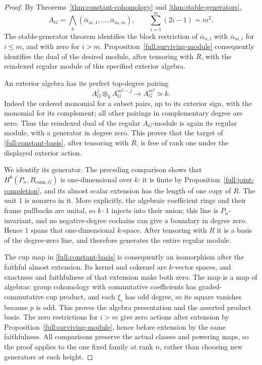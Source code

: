 \begin{proof}
By Theorems~\ref{thm:constant-cohomology} and
\ref{thm:stable-generators},
\[
 A_G=\bigwedge_k
       (\overline\alpha_{m,1},\ldots,\overline\alpha_{m,m}),
 \qquad \sum_{i=1}^m(2i-1)=m^2.
\]
The stable-generator theorem identifies the block restriction of
$\overline\alpha_{n,i}$ with $\overline\alpha_{m,i}$ for
$i\leq m$, and with zero for $i>m$.
Proposition~\ref{full:surviving-module} consequently identifies
the dual of the desired module, after tensoring with $R$,
with the reindexed regular module of this specified exterior
algebra.

An exterior algebra has its perfect top-degree pairing
\[
 A_G^j\otimes_k A_G^{m^2-j}
       \longrightarrow A_G^{m^2}\simeq k.
\]
Indeed the ordered monomial for a subset pairs, up to its
exterior sign, with the monomial for its complement; all other
pairings in complementary degree are zero.
Thus the reindexed dual of the regular $A_G$-module is again
its regular module, with a generator in degree zero.
This proves that the target of \eqref{full:constant-basis},
after tensoring with $R$, is free of rank one under the
displayed exterior action.

We identify its generator.  The preceding comparison shows
that $H^0(P_n,B_{\mathrm{conn},G})$ is one-dimensional over $k$:
it is finite by Proposition~\ref{full:joint-completion},
and its almost scalar extension has the length of one copy
of $R$.  The unit $1$ is nonzero in it.  More explicitly,
the algebraic coefficient rings and their frame pullbacks
are unital, so $k\cdot1$ injects into their union; this line
is $P_n$-invariant, and no negative-degree cochains can give
a boundary in degree zero.  Hence $1$ spans that
one-dimensional $k$-space.  After tensoring with $R$ it is
a basis of the degree-zero line, and therefore generates
the entire regular module.

The cup map in \eqref{full:constant-basis} is consequently an
isomorphism after the faithful almost extension.  Its kernel
and cokernel are $k$-vector spaces, and exactness and
faithfulness of that extension make both zero.
The map is a map of algebras: group cohomology with
commutative coefficients has graded-commutative cup product,
and each $\xi_i$ has odd degree, so its square vanishes
because $p$ is odd.  This proves the algebra presentation and
the asserted product basis.
The zero restrictions for $i>m$ give zero actions after
extension by Proposition~\ref{full:surviving-module}, hence
before extension by the same faithfulness.
All comparisons preserve the actual classes and powering
maps, so the proof applies to the one fixed family at rank
$n$, rather than choosing new generators at each height.
\end{proof}
